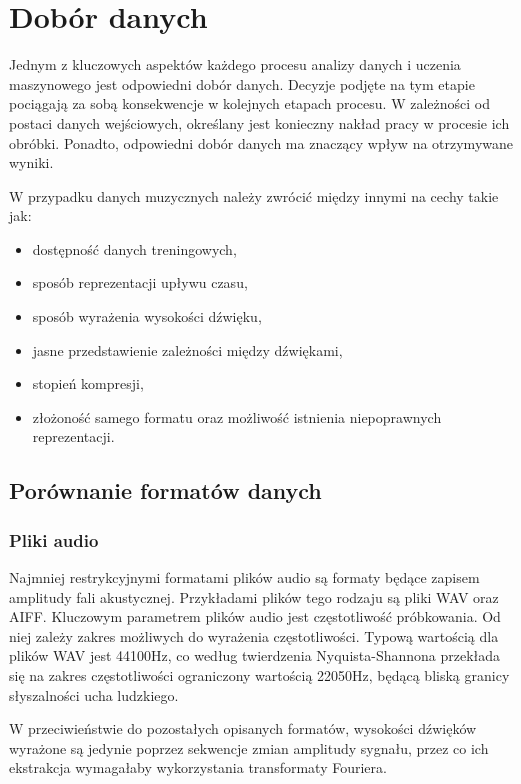 \chapter {Dobór danych} 
{
    Jednym z kluczowych aspektów każdego procesu analizy danych i uczenia maszynowego
    jest odpowiedni dobór danych. Decyzje podjęte na tym etapie pociągają za sobą 
    konsekwencje w kolejnych etapach procesu. W zależności od postaci danych wejściowych,
    określany jest konieczny nakład pracy w procesie ich obróbki. 
    Ponadto, odpowiedni dobór danych ma znaczący wpływ na otrzymywane wyniki.

    W przypadku danych muzycznych należy zwrócić między innymi na cechy takie jak:
    \begin{itemize}
        \item dostępność danych treningowych,
        \item sposób reprezentacji upływu czasu,
        \item sposób wyrażenia wysokości dźwięku,
        \item jasne przedstawienie zależności między dźwiękami,
        \item stopień kompresji,
        \item złożoność samego formatu oraz możliwość istnienia niepoprawnych reprezentacji.
    \end{itemize}

    \section{Porównanie formatów danych}
    {
        \subsection{Pliki audio}
        {
            Najmniej restrykcyjnymi formatami plików audio są formaty będące zapisem
            amplitudy fali akustycznej. Przykładami plików tego rodzaju są pliki WAV
            oraz AIFF.
            Kluczowym parametrem plików audio jest częstotliwość próbkowania. Od niej
            zależy zakres możliwych do wyrażenia częstotliwości. Typową wartością dla plików
            WAV jest 44100Hz, co według twierdzenia Nyquista-Shannona przekłada się na zakres
            częstotliwości ograniczony wartością 22050Hz, będącą bliską granicy słyszalności
            ucha ludzkiego. 

            W przeciwieństwie do pozostałych opisanych formatów, wysokości dźwięków wyrażone są 
            jedynie poprzez sekwencje zmian amplitudy sygnału, przez co
            ich ekstrakcja wymagałaby wykorzystania transformaty Fouriera.

}}}
